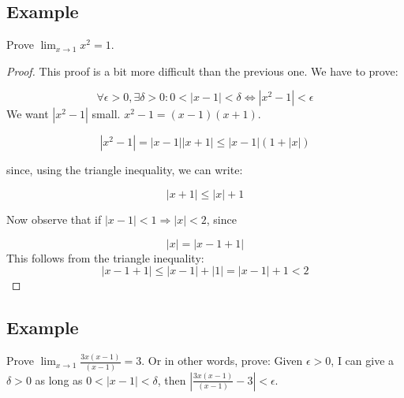 \message{ !name(RealAnalysis.tex)}\documentclass[12pt]{scrbook}
\begin{document}
\clearpage
\subsection{Example}

Prove $\lim_{x \to 1} x^2 = 1$.

\hspace{5cm}


\begin{proof}
This proof is a bit more difficult than the previous one.  We have to prove:

\[ \forall \epsilon > 0,  \exists \delta > 0: 0 < | x - 1 | < \delta \Leftrightarrow | x^2 - 1 | < \epsilon \]
We want $ | x^2 - 1| $ small.  $x^2 - 1 = (x-1)(x+1)$.

\[ | x^2 - 1 | = | x - 1 | | x + 1 | \leq | x - 1 | ( 1 + |x| ) \]

since, using the triangle inequality, we can write:

\[ | x + 1 | \leq | x | + 1 \]

Now observe that if $ | x - 1 |  < 1 \Rightarrow | x | < 2$, since 

\[ | x | = | x - 1 + 1 | \]
This follows from the triangle inequality:
\[ | x - 1 + 1 |  \leq | x - 1 | + |1| = |x - 1| + 1 < 2 \]




\end{proof}

\clearpage
\subsection{Example}

Prove $\lim_{x \to 1} \frac{3x(x-1)}{(x-1)} = 3$.
Or in other words, 
prove: Given $\epsilon > 0$, I can give a $\delta > 0$ as long as $ 0 < | x - 1 | < \delta $, then 
$ \left | \frac{3x(x-1)}{(x-1)} - 3 \right | < \epsilon $.
\end{document}
